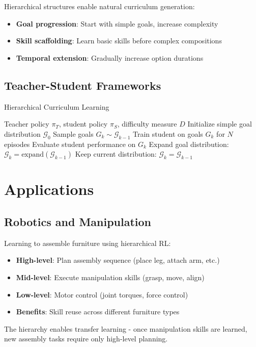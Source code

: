 Hierarchical structures enable natural curriculum generation:

\begin{itemize}
    \item \textbf{Goal progression}: Start with simple goals, increase complexity
    \item \textbf{Skill scaffolding}: Learn basic skills before complex compositions
    \item \textbf{Temporal extension}: Gradually increase option durations
\end{itemize}

\subsection{Teacher-Student Frameworks}

\begin{algorithm}
\caption{Hierarchical Curriculum Learning}
\begin{algorithmic}
\REQUIRE Teacher policy $\pi_T$, student policy $\pi_S$, difficulty measure $D$
\STATE Initialize simple goal distribution $\mathcal{G}_0$
    \STATE Sample goals $G_k \sim \mathcal{G}_{k-1}$
    \STATE Train student on goals $G_k$ for $N$ episodes
    \STATE Evaluate student performance on $G_k$
        \STATE Expand goal distribution: $\mathcal{G}_k = \text{expand}(\mathcal{G}_{k-1})$
    \ELSE
        \STATE Keep current distribution: $\mathcal{G}_k = \mathcal{G}_{k-1}$
    \ENDIF
\ENDFOR
\end{algorithmic}
\end{algorithm}

\section{Applications}

\subsection{Robotics and Manipulation}

\begin{examplebox}
Learning to assemble furniture using hierarchical RL:
\begin{itemize}
    \item \textbf{High-level}: Plan assembly sequence (place leg, attach arm, etc.)
    \item \textbf{Mid-level}: Execute manipulation skills (grasp, move, align)
    \item \textbf{Low-level}: Motor control (joint torques, force control)
    \item \textbf{Benefits}: Skill reuse across different furniture types
\end{itemize}

The hierarchy enables transfer learning - once manipulation skills are learned, new assembly tasks require only high-level planning.
\end{examplebox}

